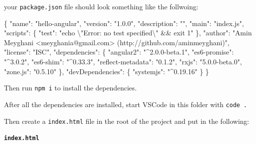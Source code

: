 \documentclass[12pt,]{article}
\newenvironment{Shaded}{}{}
\newcommand{\DataTypeTok}[1]{{#1}}
\newcommand{\CharTok}[1]{\textcolor[rgb]{0.00,0.50,0.50}{{#1}}}
\newcommand{\StringTok}[1]{\textcolor[rgb]{0.00,0.50,0.50}{{#1}}}
\newcommand{\FunctionTok}[1]{{#1}}
\begin{document}
your \texttt{package.json} file should look something like the
follwoing:

\begin{Shaded}
\begin{Highlighting}[numbers=left,,]
\FunctionTok{\{}
  \DataTypeTok{"name"}\FunctionTok{:} \StringTok{"hello-angular"}\FunctionTok{,}
  \DataTypeTok{"version"}\FunctionTok{:} \StringTok{"1.0.0"}\FunctionTok{,}
  \DataTypeTok{"description"}\FunctionTok{:} \StringTok{""}\FunctionTok{,}
  \DataTypeTok{"main"}\FunctionTok{:} \StringTok{"index.js"}\FunctionTok{,}
  \DataTypeTok{"scripts"}\FunctionTok{:} \FunctionTok{\{}
    \DataTypeTok{"test"}\FunctionTok{:} \StringTok{"echo }\CharTok{\textbackslash{}"}\StringTok{Error: no test specified}\CharTok{\textbackslash{}"}\StringTok{ && exit 1"}
  \FunctionTok{\},}
  \DataTypeTok{"author"}\FunctionTok{:} \StringTok{"Amin Meyghani <meyghania@gmail.com> (http://github.com/aminmeyghani)"}\FunctionTok{,}
  \DataTypeTok{"license"}\FunctionTok{:} \StringTok{"ISC"}\FunctionTok{,}
  \DataTypeTok{"dependencies"}\FunctionTok{:} \FunctionTok{\{}
    \DataTypeTok{"angular2"}\FunctionTok{:} \StringTok{"^2.0.0-beta.1"}\FunctionTok{,}
    \DataTypeTok{"es6-promise"}\FunctionTok{:} \StringTok{"^3.0.2"}\FunctionTok{,}
    \DataTypeTok{"es6-shim"}\FunctionTok{:} \StringTok{"^0.33.3"}\FunctionTok{,}
    \DataTypeTok{"reflect-metadata"}\FunctionTok{:} \StringTok{"0.1.2"}\FunctionTok{,}
    \DataTypeTok{"rxjs"}\FunctionTok{:} \StringTok{"5.0.0-beta.0"}\FunctionTok{,}
    \DataTypeTok{"zone.js"}\FunctionTok{:} \StringTok{"0.5.10"}
  \FunctionTok{\},}
  \DataTypeTok{"devDependencies"}\FunctionTok{:} \FunctionTok{\{}
    \DataTypeTok{"systemjs"}\FunctionTok{:} \StringTok{"^0.19.16"}
  \FunctionTok{\}}
\FunctionTok{\}}
\end{Highlighting}
\end{Shaded}

Then run \texttt{npm\ i} to install the dependencies.

After all the dependencies are installed, start VSCode in this folder
with \texttt{code\ .}

Then create a \texttt{index.html} file in the root of the project and
put in the following:

\textbf{\texttt{index.html}}
\end{document}
